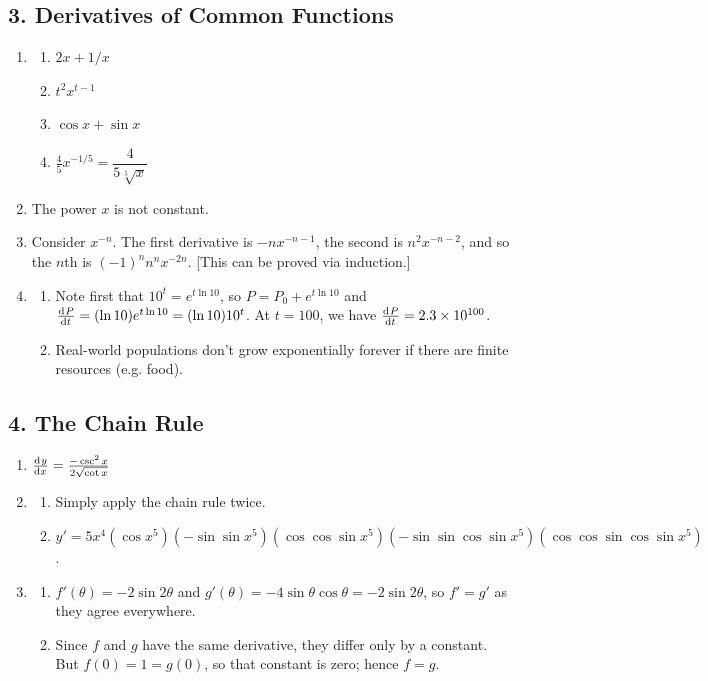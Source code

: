 \subsection*{3. Derivatives of Common Functions}
\begin{enumerate}
  \item
    \begin{enumerate}
      \item $ 2x + 1/x $
      \item $ t^2 x^{t - 1} $
      \item $ \cos x + \sin x $
      \item $ \frac{4}{5} x^{-1/5} = \dfrac{4}{5 \sqrt[5]{x}} $
    \end{enumerate}
  \item The power $ x $ is not constant.
  \item Consider $ x^{-n} $. The first derivative is $ -n x^{-n - 1} $, the second is $ n^2 x^{-n - 2} $, and so the $ n$th
        is $ (-1)^n n^n x^{-2n} $. [This can be proved via induction.]
  \item
    \begin{enumerate}
      \item Note first that $ 10^t = e^{t \ln 10} $, so $ P = P_0 + e^{t \ln 10} $ and $ \od{P}{t} = (\ln 10)e^{t \ln 10} = (\ln 10)10^t $.
            At $ t = 100 $, we have $ \od{P}{t} = \num{2.3e100} $.
      \item Real-world populations don't grow exponentially forever if there are finite resources (e.g. food).
    \end{enumerate}
\end{enumerate}

\subsection*{4. The Chain Rule}
\begin{enumerate}
  \item $ \od{y}{x} = \frac{-\csc^2 x}{2\sqrt{\cot x}} $
  \item
    \begin{enumerate}
      \item Simply apply the chain rule twice.
      \item $ y' = 5x^4 (\cos x^5)(-\sin \sin x^5)(\cos \cos \sin x^5)(-\sin \sin \cos \sin x^5)(\cos \cos \sin \cos \sin x^5) $.
    \end{enumerate}
  \item
    \begin{enumerate}
      \item $ f'(\theta) = -2 \sin 2\theta $ and $ g'(\theta) = -4\sin \theta \cos \theta = -2\sin 2\theta $, so $ f' = g' $ as they agree everywhere.
      \item Since $ f $ and $ g $ have the same derivative, they differ only by a constant. But $ f(0) = 1 = g(0) $, so that constant is zero; hence $ f = g $.
    \end{enumerate}
\end{enumerate}

